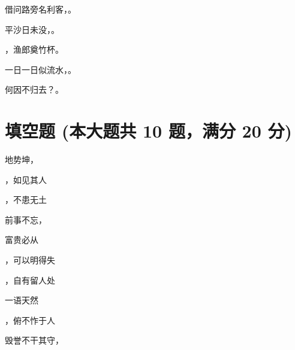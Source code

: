 \documentclass[12pt, a4paper, addpoints, answers]{exam}
\begin{document}
\begin{questions}
\question[3] 借问路旁名利客，\fillin 。

   

 

\question[3] 平沙日未没，\fillin 。

   

 

\question[3] \fillin ，渔郎奠竹杯。

   

 

\question[3] 一日一日似流水，\fillin 。

   

 

\question[3] 何因不归去？\fillin 。

   

 
\end{questions}

\hspace{5cm}

\section{\normalsize{填空题 (本大题共 10 题，满分 20 分)}}
\hspace{1.5cm}
\begin{multicols}{2}
\begin{questions}
\question[2] 地势坤，\fillin 

   

 

\question[2] \fillin ，如见其人

   

 

\question[2] \fillin ，不患无土

   

 

\question[2] 前事不忘，\fillin 

   

 

\question[2] 富贵必从\fillin 

   

 

\question[2] \fillin ，可以明得失

   

 

\question[2] \fillin ，自有留人处

   

 

\question[2] 一语天然\fillin 

   

 

\question[2] \fillin ，俯不怍于人

   

 

\question[2] 毁誉不干其守，\fillin 

   

 
\end{questions}
\end{multicols}
\end{document}
